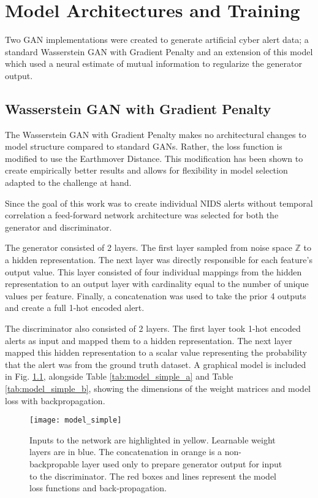 \chapter{Model Architectures and Training}
\label{sec:model_arch}
Two GAN implementations were created to generate artificial cyber alert data; a standard Wasserstein GAN with Gradient Penalty and an extension of this model which used a neural estimate of mutual information to regularize the generator output.  

\section{Wasserstein GAN with Gradient Penalty}
\label{sec:gan}
The Wasserstein GAN with Gradient Penalty makes no architectural changes to model structure compared to standard GANs. Rather, the loss function is modified to use the Earthmover Distance. This modification has been shown to create empirically better results and allows for flexibility in model selection adapted to the challenge at hand.

Since the goal of this work was to create individual NIDS alerts without temporal correlation a feed-forward network architecture was selected for both the generator and discriminator. 

The generator consisted of 2 layers. The first layer sampled from noise space $\mathbb{Z}$ to a hidden representation. The next layer was directly responsible for each feature's output value. This layer consisted of four individual mappings from the hidden representation to an output layer with cardinality equal to the number of unique values per feature. Finally, a concatenation was used to take the prior 4 outputs and create a full 1-hot encoded alert. 

The discriminator also consisted of 2 layers. The first layer took 1-hot encoded alerts as input and mapped them to a hidden representation. The next layer mapped this hidden representation to a scalar value representing the probability that the alert was from the ground truth dataset. A graphical model is included in Fig. \ref{fig:model_simple}, alongside Table \ref{tab:model_simple_a} and Table \ref{tab:model_simple_b}, showing the dimensions of the weight matrices and model loss with backpropagation.

\begin{figure}[!htbp]
	\centering%
	\texttt{[image: model\_simple]}
	\caption{
		Inputs to the network are highlighted in yellow. Learnable weight layers are in blue. The concatenation in orange is a non-backpropable layer used only to prepare generator output for input to the discriminator. The red boxes and lines represent the model loss functions and back-propagation.
	}
	\label{fig:model_simple}
\end{figure}


